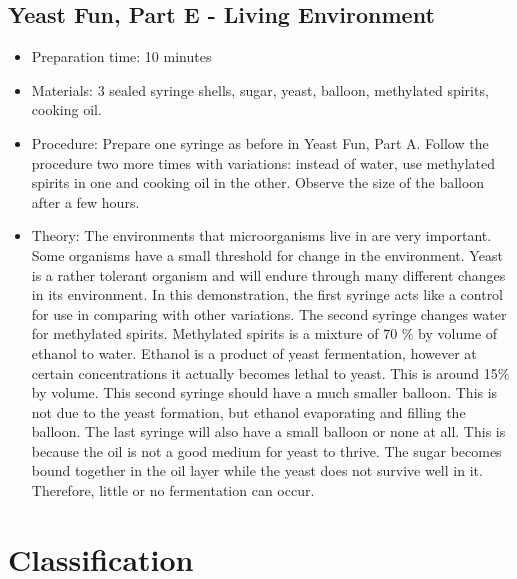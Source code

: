 \subsection{Yeast Fun, Part E - Living Environment}
\begin{itemize}
\item{Preparation time: 10 minutes}
\item{Materials:  3 sealed syringe shells, sugar, yeast, balloon, methylated spirits, cooking oil.}
\item{Procedure: Prepare one syringe as before in Yeast Fun, Part A. Follow the procedure two more times with variations: instead of water, use methylated spirits in one and cooking oil in the other. Observe the size of the balloon after a few hours. }
\item{Theory: The environments that microorganisms live in are very important. Some organisms have a small threshold for change in the environment. Yeast is a rather tolerant organism and will endure through many different changes in its environment. In this demonstration, the first syringe acts like a control for use in comparing with other variations. The second syringe changes water for methylated spirits. Methylated spirits is a mixture of 70 \% by volume of ethanol to water. Ethanol is a product of yeast fermentation, however at certain concentrations it actually becomes lethal to yeast. This is around 15\% by volume. This second syringe should have a much smaller balloon. This is not due to the yeast formation, but ethanol evaporating and filling the balloon. The last syringe will also have a small balloon or none at all. This is because the oil is not a good medium for yeast to thrive. The sugar becomes bound together in the oil layer while the yeast does not survive well in it. Therefore, little or no fermentation can occur.}
\end{itemize}

\section{Classification}

